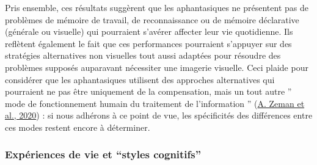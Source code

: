\documentclass[
  12pt,
]{article}
\begin{document}
Pris ensemble, ces résultats suggèrent que les aphantasiques ne
présentent pas de problèmes de mémoire de travail, de reconnaissance ou
de mémoire déclarative (générale ou visuelle) qui pourraient s'avérer
affecter leur vie quotidienne. Ils reflètent également le fait que ces
performances pourraient s'appuyer sur des stratégies alternatives non
visuelles tout aussi adaptées pour résoudre des problèmes supposés
auparavant nécessiter une imagerie visuelle. Ceci plaide pour considérer
que les aphantasiques utilisent des approches alternatives qui
pourraient ne pas être uniquement de la compensation, mais un tout autre
'' mode de fonctionnement humain du traitement de l'information ''
(\protect\hyperlink{ref-zemanPhantasiaPsychologicalSignificance2020}{A.
Zeman et al., 2020}) : si nous adhérons à ce point de vue, les
spécificités des différences entre ces modes restent encore à
déterminer.

\hypertarget{expuxe9riences-de-vie-et-styles-cognitifs}{%
\subsubsection{Expériences de vie et ``styles
cognitifs''}\label{expuxe9riences-de-vie-et-styles-cognitifs}}
\end{document}

